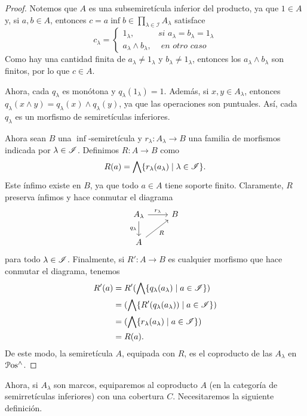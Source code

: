 \begin{proof}
    Notemos que $A$ es una subsemiretícula inferior del producto,
    ya que $1\in A$ y, si $a,b\in A$, entonces
    $c=a\inf b\in \prod_{\lambda\in\mathscr I} A_\lambda$
    satisface
    \[c_\lambda=
    \begin{cases}
        1_\lambda, & \textit{si }a_\lambda=b_\lambda=1_\lambda\\
        a_\lambda\wedge b_\lambda, & \textit{ en otro caso}
    \end{cases}
    \]
    Como hay una cantidad finita de
    $a_\lambda\neq 1_\lambda$ y $b_\lambda\neq 1_\lambda$,
    entonces los $a_\lambda\wedge b_\lambda$ son finitos,
    por lo que $c\in A$.
    
    Ahora, cada $q_\lambda$ es monótona y $q_\lambda(1_\lambda)=1$.
    Además, si $x,y\in A_\lambda$, entonces
    $q_\lambda(x\wedge y)=q_\lambda(x)\wedge q_\lambda(y)$,
    ya que las operaciones son puntuales.
    Así, cada $q_\lambda$ es un morfismo de semiretículas
    inferiores.
    
    Ahora sean $B$ una $\inf$-semiretícula y
    $r_\lambda:A_\lambda\to B$ una familia de morfismos
    indicada por $\lambda\in\mathscr{I}$.
    Definimos $R:A\to B$ como
    \[
        R(a) = \bigwedge\{r_\lambda(a_\lambda) \mid \lambda \in \mathscr{I}\}
    .\]
    Este ínfimo existe en $B$, ya que todo $a\in A$ tiene soporte
    finito.
    Claramente, $R$ preserva ínfimos y hace conmutar el diagrama
    \[
        \begin{tikzcd}
            A_\lambda \ar[r,"r_\lambda"] \ar[d,"q_\lambda"']
            & B \\
            A \ar[ur,"R"']
        \end{tikzcd}
    \]
    para todo $\lambda\in \mathscr{I}$.
    Finalmente, si $R':A\to B$ es cualquier morfismo
    que hace conmutar el diagrama, tenemos
    \begin{align*}
        R'(a)
        &= R'(\bigwedge\{q_\lambda(a_\lambda)\mid a\in \mathscr{I}\}) \\
        &= (\bigwedge\{R'(q_\lambda(a_\lambda))\mid a\in \mathscr{I}\}) \\
        &= (\bigwedge\{r_\lambda(a_\lambda)\mid a\in \mathscr{I}\}) \\
        &= R(a).
    \end{align*}
    De este modo, la semiretícula $A$, equipada con $R$,
    es el coproducto de las $A_\lambda$ en $\mathcal{P}\mathrm{os}^{\wedge}$.
\end{proof}

Ahora, si $A_\lambda$ son marcos, equiparemos al coproducto $A$ (en la
categoría de semirretículas inferiores) con una cobertura $C$.
Necesitaremos la siguiente definición.

